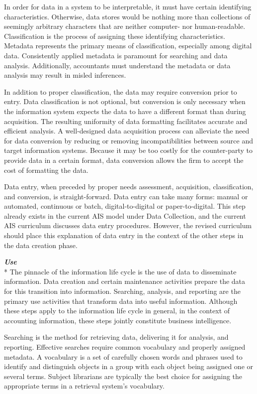 \documentclass[12pt]{article}
\newcommand{\SubSubSection}[1]{{\centering{}\normalsize{}\textbf{\emph{#1}}}\\*\indent{}}
\begin{document}
In order for data in a system to be interpretable, it must have certain identifying characteristics. Otherwise, data stores would be nothing more than collections of seemingly arbitrary characters that are neither computer- nor human-readable. Classification is the process of assigning these identifying characteristics. Metadata represents the primary means of classification, especially among digital data. Consistently applied metadata is paramount for searching and data analysis. Additionally, accountants must understand the metadata or data analysis may result in misled inferences.

In addition to proper classification, the data may require conversion prior to entry. Data classification is not optional, but conversion is only necessary when the information system expects the data to have a different format than during acquisition. The resulting uniformity of data formatting facilitates accurate and efficient analysis. A well-designed data acquisition process can alleviate the need for data conversion by reducing or removing incompatibilities between source and target information systems. Because it may be too costly for the counter-party to provide data in a certain format, data conversion allows the firm to accept the cost of formatting the data.

Data entry, when preceded by proper needs assessment, acquisition, classification, and conversion, is straight-forward. Data entry can take many forms: manual or automated, continuous or batch, digital-to-digital or paper-to-digital. This step already exists in the current AIS model under Data Collection, and the current AIS curriculum discusses data entry procedures. However, the revised curriculum should place this explanation of data entry in the context of the other steps in the data creation phase.

\SubSubSection{Use}
The pinnacle of the information life cycle is the use of data to disseminate information. Data creation and certain maintenance activities prepare the data for this transition into information. Searching, analysis, and reporting are the primary use activities that transform data into useful information. Although these steps apply to the information life cycle in general, in the context of accounting information, these steps jointly constitute business intelligence.

Searching is the method for retrieving data, delivering it for analysis, and reporting. Effective searches require common vocabulary and properly assigned metadata. A vocabulary is a set of carefully chosen words and phrases used to identify and distinguish objects in a group with each object being assigned one or several terms. Subject librarians are typically the best choice for assigning the appropriate terms in a retrieval system's vocabulary.
\end{document}
